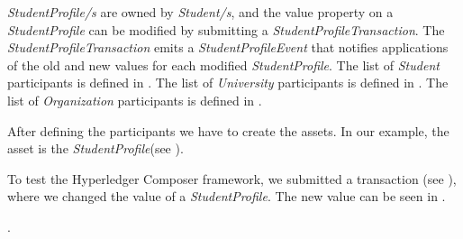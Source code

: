 \emph{StudentProfile/s} are owned by \emph{Student/s}, and the value property on a \emph{StudentProfile} can be modified by submitting a \emph{StudentProfileTransaction}. The \emph{StudentProfileTransaction} emits a \emph{StudentProfileEvent} that notifies applications of the old and new values for each modified \emph{StudentProfile}.	
The list of \emph{Student} participants is defined in .
The list of \emph{University} participants is defined in .
The list of \emph{Organization} participants is defined in .



After defining the participants we have to create the assets. In our example, the asset is the \emph{StudentProfile}(see ).

To test the Hyperledger Composer framework, we submitted a transaction (see ), where we changed the value of a \emph{StudentProfile}. The new value can be seen in .

.



